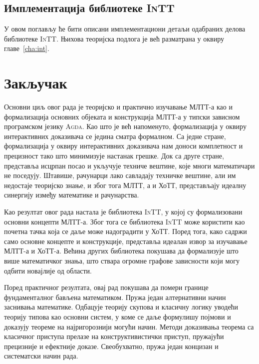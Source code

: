 \documentclass[12pt,oneside]{memoir}
\begin{document}
\section{Имплементација библиотеке \textsc{InTT}}

У овом поглављу ће бити описани имплементациони детаљи одабраних делова библиотеке \textsc{InTT}. Њихова теоријска подлога је већ разматрана у оквиру главе~\ref{cha:int}. 



\chapter{Закључак}

Основни циљ овог рада је теоријско и практично изучавање МЛТТ-а као и формализација основних објеката и конструкција МЛТТ-а у типски зависном програмском језику \textsc{Agda}. Као што је већ напоменуто, формализација у оквиру интерактивних доказивача се једина сматра формалном. Са једне стране, формализација у оквиру интерактивних доказивача нам доноси комплетност и прецизност тако што минимизује настанак грешке. Док са друге стране, представља исцрпан посао и укључује техниче вештине, које многи математичари не поседују. Штавише, рачунарци лако савладају техничке вештине, али им недостаје теоријско знање, и због тога МЛТТ, а и ХоТТ, представљају идеалну синергију између математике и рачунарства.

Као резултат овог рада настала је библиотека \textsc{InTT}, у којој су формализовани основни концепти МЛТТ-а. Због тога се библиотека \textsc{InTT} може користити као почетна тачка која се даље може надоградити у ХоТТ. Поред тога, како садржи само основне концепте и конструкције, представља идеалан извор за изучавање МЛТТ-а и ХоТТ-а. Већина других библиотека покушава да формализује што више математичког знања, што ствара огромне графове зависности који могу одбити новајлије од области. 

Поред практичног резултата, овај рад покушава да помери границе фундаменталног бављена математиком. Пружа један алтернативни начин заснивања математике. Одбацује теорију скупова и класичну логику уводећи теорију типова као основни систем, у коме се даље формулишу појмови и доказују теореме на најригорознији могући начин. Методи доказивања теорема са класичног приступа прелазе на конструктивистички приступ, пружајући прецизније и ефектније доказе. Свеобухватно, пружа један концизан и систематски начин рада.
\end{document}

